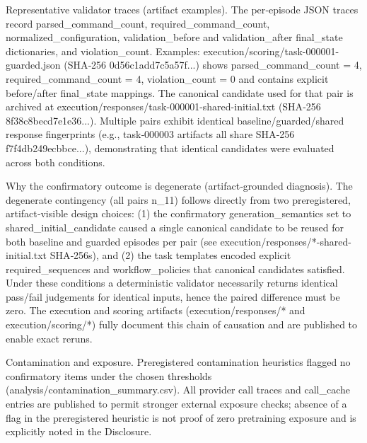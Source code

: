 \documentclass[conference]{IEEEtran}
\begin{document}
Representative validator traces (artifact examples). The per‑episode JSON traces record parsed\_command\_count, required\_command\_count, normalized\_configuration, validation\_before and validation\_after final\_state dictionaries, and violation\_count. Examples: execution/scoring/task-000001-guarded.json (SHA‑256 0d56c1add7c5a57f...) shows parsed\_command\_count = 4, required\_command\_count = 4, violation\_count = 0 and contains explicit before/after final\_state mappings. The canonical candidate used for that pair is archived at execution/responses/task-000001-shared-initial.txt (SHA‑256 8f38c8becd7e1e36...). Multiple pairs exhibit identical baseline/guarded/shared response fingerprints (e.g., task‑000003 artifacts all share SHA‑256 f7f4db249ecbbce...), demonstrating that identical candidates were evaluated across both conditions.

Why the confirmatory outcome is degenerate (artifact‑grounded diagnosis). The degenerate contingency (all pairs n\_11) follows directly from two preregistered, artifact‑visible design choices: (1) the confirmatory generation\_semantics set to shared\_initial\_candidate caused a single canonical candidate to be reused for both baseline and guarded episodes per pair (see execution/responses/*-shared-initial.txt SHA‑256s), and (2) the task templates encoded explicit required\_sequences and workflow\_policies that canonical candidates satisfied. Under these conditions a deterministic validator necessarily returns identical pass/fail judgements for identical inputs, hence the paired difference must be zero. The execution and scoring artifacts (execution/responses/* and execution/scoring/*) fully document this chain of causation and are published to enable exact reruns.

Contamination and exposure. Preregistered contamination heuristics flagged no confirmatory items under the chosen thresholds (analysis/contamination\_summary.csv). All provider call traces and call\_cache entries are published to permit stronger external exposure checks; absence of a flag in the preregistered heuristic is not proof of zero pretraining exposure and is explicitly noted in the Disclosure.
\end{document}

